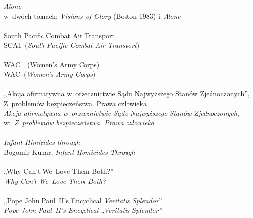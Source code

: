 \documentclass[a4paper,11pt]{article}
\begin{document}
\textit{Alone} \\
\Powin w~dwóch tomach: \textit{Visions~of Glory} (Boston 1983)
i~\textit{Alone} \\
 \\
\Jest  South Pacific Combat Air Transport \\
\Powin SCAT (\textit{South Pacific Combat Air Transport}) \\
 \\
\Jest  WAC~~(Women's Army Corps) \\
\Powin WAC~(\textit{Women's Army Corps}) \\
 \\
\Jest „Akcja afirmatywna w~orzecznictwie Sądu Najwyższego Stanów
Zjednoczonych”, Z~problemów bezpieczeństwa. Prawa człowieka \\
\Powin \textit{Akcja afirmatywna w~orzecznictwie Sądu Najwyższego Stanów
  Zjednoczonych}, w:~\textit{Z~problemów bezpieczeństwa. Prawa człowieka} \\
 \\
\Jest \textit{Infant Himicides through} \\
\Powin Bogomir Kuhar, \textit{Infant Homicides Through} \\
 \\
\Jest  „Why Can't We~Love Them Both?” \\
\Powin \textit{Why Can't We~Love Them Both?} \\
 \\
\Jest  „Pope John Paul~II's Encyclical \textit{Veritatis Splendor}” \\
\Powin \textit{Pope John Paul~II's Encyclical „Veritatis Splendor”} \\

































{}






\end{document}
